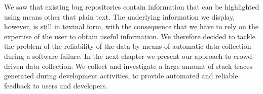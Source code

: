 
We saw that existing bug repositories contain information that can be highlighted using means other that plain text.
The underlying information we display, however, is still in textual form, with the consequence that we have to rely on the expertise of the user to obtain useful information.
We therefore decided to tackle the problem of the reliability of the data by means of automatic data collection during a software failure.
In the next chapter we present our approach to crowd-driven data collection: We collect and investigate a large amount of stack traces generated during development activities, to provide automated and reliable feedback to users and developers.





